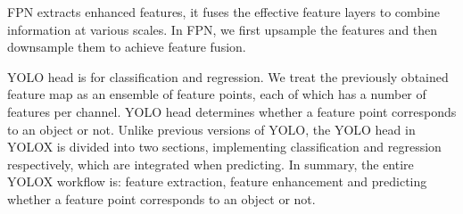 FPN extracts enhanced features, it fuses the effective feature layers to combine information at various scales. In FPN, we first upsample the features and then downsample them to achieve feature fusion. 

YOLO head is for classification and regression. We treat the previously obtained feature map as an ensemble of feature points, each of which has a number of features per channel. YOLO head determines whether a feature point corresponds to an object or not. Unlike previous versions of YOLO, the YOLO head in YOLOX is divided into two sections, implementing classification and regression respectively, which are integrated when predicting. In summary, the entire YOLOX workflow is: feature extraction, feature enhancement and predicting whether a feature point corresponds to an object or not.


